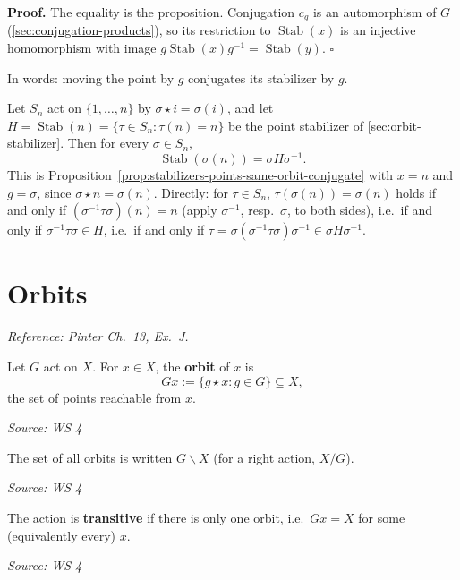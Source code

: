 \documentclass[11pt]{report}
\renewenvironment{proof}[1][Proof]{\noindent\textbf{#1.} }{\hfill$\square$\par\vspace{5pt}}
\newcommand{\srcline}[1]{\par\hfill{\footnotesize\textit{Source: #1}}}
\begin{document}
\begin{proof}
The equality is the proposition. Conjugation $c_g$ is an automorphism of $G$ (\ref{sec:conjugation-products}), so its restriction to $\operatorname{Stab}(x)$ is an injective homomorphism with image $g\operatorname{Stab}(x)g^{-1} = \operatorname{Stab}(y)$.
\end{proof}

In words: moving the point by $g$ conjugates its stabilizer by $g$.

\begin{exbox}\label{ex:stab-point-stabilizers-sn-conjugate}
Let $S_n$ act on $\{1, \ldots, n\}$ by $\sigma \star i = \sigma(i)$, and let $H = \operatorname{Stab}(n) = \{\tau \in S_n : \tau(n) = n\}$ be the point stabilizer of \ref{sec:orbit-stabilizer}. Then for every $\sigma \in S_n$,
\[ \operatorname{Stab}(\sigma(n)) = \sigma H \sigma^{-1}. \]
This is Proposition~\ref{prop:stabilizers-points-same-orbit-conjugate} with $x = n$ and $g = \sigma$, since $\sigma \star n = \sigma(n)$. Directly: for $\tau \in S_n$, $\tau(\sigma(n)) = \sigma(n)$ holds if and only if $(\sigma^{-1}\tau\sigma)(n) = n$ (apply $\sigma^{-1}$, resp.\ $\sigma$, to both sides), i.e.\ if and only if $\sigma^{-1}\tau\sigma \in H$, i.e.\ if and only if $\tau = \sigma(\sigma^{-1}\tau\sigma)\sigma^{-1} \in \sigma H \sigma^{-1}$.
\end{exbox}

\section{Orbits}\label{sec:orbits}

\textit{Reference: Pinter Ch.\ 13, Ex.\ J.}

\begin{defbox}[{Orbit}]\label{def:orbit-orbit-space}
Let $G$ act on $X$. For $x \in X$, the \textbf{orbit} of $x$ is
\[ Gx := \{ g \star x : g \in G \} \subseteq X, \]
the set of points reachable from $x$.
\srcline{WS 4}
\end{defbox}

\begin{defbox}\label{def:orbit-space}
The set of all orbits is written $G \backslash X$ (for a right action, $X/G$).
\srcline{WS 4}
\end{defbox}

\begin{defbox}\label{def:transitive-action}
The action is \textbf{transitive} if there is only one orbit, i.e.\ $Gx = X$ for some (equivalently every) $x$.
\srcline{WS 4}
\end{defbox}
\end{document}
